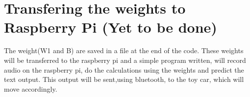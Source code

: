\documentclass[a4paper,12pt]{article}
\begin{document}
\section{Transfering the weights to Raspberry Pi (Yet to be done)}
The weight(W1 and B) are saved in a file at the end of the code. These weights will be transferred to the raspberry pi and a simple program written, will record audio on the raspberry pi, do the calculations using the weights and predict the text output. This output will be sent,using bluetooth, to the toy car, which will move accordingly.
\end{document}
